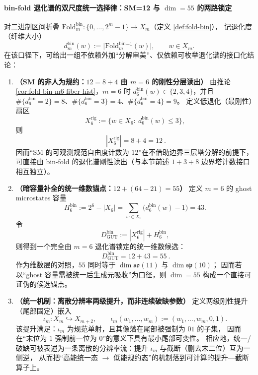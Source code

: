 \paragraph{bin-fold 退化谱的双尺度统一选择律：SM=12 与 \texorpdfstring{$\dim=55$}{dim=55} 的两路锁定}
对二进制区间折叠 \(\mathrm{Fold}^{\mathrm{bin}}_m:\{0,\dots,2^m-1\}\to X_m\)（定义 \ref{def:fold-bin}），
记退化度（纤维大小）
\[
d^{\mathrm{bin}}_m(w):=\bigl|\mathrm{Fold}^{\mathrm{bin}}_m{}^{-1}(w)\bigr|,\qquad w\in X_m.
\]
在该口径下，可给出一组不依赖外加“分解审美”、仅依赖可枚举退化谱的接口化结论：
\begin{enumerate}
  \item \textbf{（SM 的非人为规约：\(12=8+4\) 由 \(m=6\) 的刚性分层读出）}
  由推论 \ref{cor:fold-bin-m6-fiber-hist}，\(m=6\) 时 \(d^{\mathrm{bin}}_6(w)\in\{2,3,4\}\)，并且
  \(\#\{d^{\mathrm{bin}}_6=2\}=8\)、\(\#\{d^{\mathrm{bin}}_6=3\}=4\)、\(\#\{d^{\mathrm{bin}}_6=4\}=9\)。
  定义低退化（最刚性）扇区
  \[
  X^{\mathrm{rig}}_6:=\{w\in X_6:\ d^{\mathrm{bin}}_6(w)\le 3\},
  \]
  则
  \[
  \boxed{\ |X^{\mathrm{rig}}_6|=8+4=12\ }.
  \]
  因而“SM 的可观测规范自由度计数为 \(12\)”在不借助边界三层塔分解的前提下，
  可直接由 bin-fold 的退化谱刚性读出（与本节前述 \(1+3+8\) 边界塔计数接口相互独立）。

  \item \textbf{（暗容量补全的统一维数锚点：\(12+(64-21)=55\)）}
  定义 \(m=6\) 的 ghost microstates 容量
  \[
  H^{\mathrm{bin}}_6:=2^6-|X_6|
  =\sum_{w\in X_6}\bigl(d^{\mathrm{bin}}_6(w)-1\bigr)
  =43.
  \]
  令
  \[
  D^{\mathrm{bin}}_{\mathrm{GUT}}:=|X^{\mathrm{rig}}_6|+H^{\mathrm{bin}}_6,
  \]
  则得到一个完全由 \(m=6\) 退化谱锁定的统一维数候选：
  \[
  \boxed{\ D^{\mathrm{bin}}_{\mathrm{GUT}}=12+43=55\ }.
  \]
  作为维数层的对照，\(55\) 同时等于 \(\dim\mathfrak{so}(11)\) 与 \(\dim\mathfrak{sp}(10)\)；
  因而若以“ghost 容量需被统一后生成元吸收”为口径，则 \(\dim=55\) 构成一个直接可证伪的候选锚点。

  \item \textbf{（统一机制：离散分辨率两级提升，而非连续破缺参数）}
  定义两级刚性提升（尾部固定）嵌入
  \[
  \iota_m:X_m\hookrightarrow X_{m+2},\qquad
  \iota_m(w_1,\dots,w_m):=(w_1,\dots,w_m,0,1).
  \]
  该提升满足：\(\iota_m\) 为规范单射，且其像落在尾部被强制为 \(01\) 的子集，
  因而在“末位为 \(1\) 强制前一位为 \(0\)”的意义下具有最小尾部可变性。
  相应地，统一/破缺可被表述为一条离散的分辨率流：提升 \(\iota_m\) 与截断（删去末二位）互为一侧逆，
  从而把“高能统一态 \(\to\) 低能规约态”的机制落到可计算的提升—截断算子上。


\end{enumerate}
